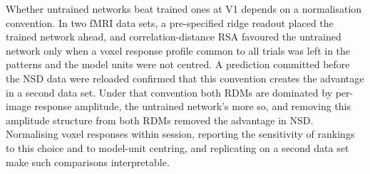 Whether untrained networks beat trained ones at V1 depends on a normalisation convention. In two fMRI data
sets, a pre-specified ridge readout placed the trained network ahead, and correlation-distance RSA favoured
the untrained network only when a voxel response profile common to all trials was left in the patterns and
the model units were not centred. A prediction committed before the NSD data were reloaded confirmed that
this convention creates the advantage in a second data set. Under that convention both RDMs are dominated by
per-image response amplitude, the untrained network's more so, and removing this amplitude structure from
both RDMs removed the advantage in NSD. Normalising voxel responses within session, reporting the
sensitivity of rankings to this choice and to model-unit centring, and replicating on a second data set make
such comparisons interpretable.
